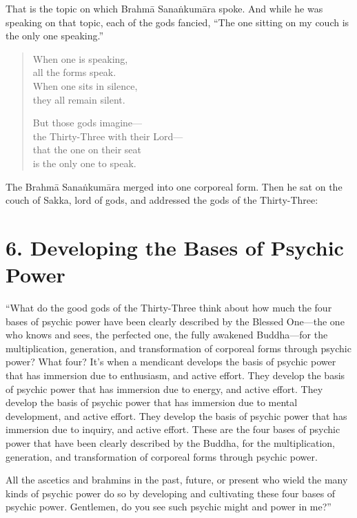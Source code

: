 \documentclass[12pt,openany]{book}%
\begin{document}
That is the topic on which \textsanskrit{Brahmā} \textsanskrit{Sanaṅkumāra} spoke. And while he was speaking on that topic, each of the gods fancied, “The one sitting on my couch is the only one speaking.” 

\begin{verse}%
When one is speaking, \\
all the forms speak. \\
When one sits in silence, \\
they all remain silent. 

But those gods imagine—\\
the Thirty-Three with their Lord—\\
that the one on their seat \\
is the only one to speak. 

%
\end{verse}

The \textsanskrit{Brahmā} \textsanskrit{Sanaṅkumāra} merged into one corporeal form. Then he sat on the couch of Sakka, lord of gods, and addressed the gods of the Thirty-Three: 

\section*{6. Developing the Bases of Psychic Power }

“What do the good gods of the Thirty-Three think about how much the four bases of psychic power have been clearly described by the Blessed One—the one who knows and sees, the perfected one, the fully awakened Buddha—for the multiplication, generation, and transformation of corporeal forms through psychic power? What four? It’s when a mendicant develops the basis of psychic power that has immersion due to enthusiasm, and active effort. They develop the basis of psychic power that has immersion due to energy, and active effort. They develop the basis of psychic power that has immersion due to mental development, and active effort. They develop the basis of psychic power that has immersion due to inquiry, and active effort. These are the four bases of psychic power that have been clearly described by the Buddha, for the multiplication, generation, and transformation of corporeal forms through psychic power. 

All the ascetics and brahmins in the past, future, or present who wield the many kinds of psychic power do so by developing and cultivating these four bases of psychic power. Gentlemen, do you see such psychic might and power in me?” 
\end{document}

